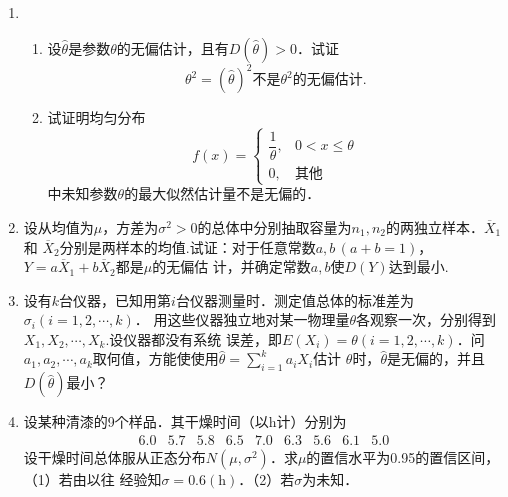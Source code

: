 \documentclass[10pt,a4paper]{article}
\begin{document}
\begin{enumerate}
    \item \begin{enumerate}
        \item 设$\hat{\theta}$是参数$\theta$的无偏估计，且有$D(\hat{\theta})>0$．试证
        $$\hat{\theta^2}=(\hat{\theta})^2\mbox{不是}\theta^2\mbox{的无偏估计.}$$
        \item 试证明均匀分布
        $$f(x)=\left\{\begin{array}{ll}
            \dfrac{1}{\theta}, & 0<x\leq \theta\\
            0, & \mbox{其他}
        \end{array}\right.$$
        中未知参数$\theta$的最大似然估计量不是无偏的．
    \end{enumerate}
    \clearpage



    \item 设从均值为$\mu$，方差为$\sigma^2>0$的总体中分别抽取容量为$n_1,n_2$的两独立样本．$\overline{X}_1$和
    $\overline{X}_2$分别是两样本的均值.试证：对于任意常数$a,b\, (a+b=1)$，$Y=a\overline{X}_1+b\overline{X}_2$都是$\mu$的无偏估
    计，并确定常数$a,b$使$D(Y)$达到最小.
    \clearpage



    \item 设有$k$台仪器，已知用第$i$台仪器测量时．测定值总体的标准差为$\sigma_i(i=1,2,\cdots,k)$．
    用这些仪器独立地对某一物理量$\theta$各观察一次，分别得到$X_1,X_2,\cdots,X_k$.设仪器都没有系统
    误差，即$E(X_i)=\theta(i=1,2,\cdots,k)$．问$a_1,a_2,\cdots,a_k$取何值，方能使使用$\displaystyle{\hat{\theta}=\sum_{i=1}^k a_iX_i}$估计
    $\theta$时，$\hat{\theta}$是无偏的，并且$D(\hat{\theta})$最小？
    \clearpage



    \item 设某种清漆的9个样品．其干燥时间（以h计）分别为
    $$\begin{array}{ccccccccc}
        6.0 & 5.7 & 5.8 & 6.5 & 7.0 & 6.3 & 5.6 & 6.1 & 5.0
    \end{array}$$
    设干燥时间总体服从正态分布$N(\mu,\sigma^2)$．求$\mu$的置信水平为0.95的置信区间，（1）若由以往
    经验知$\sigma=0.6(\mathrm{h})$．（2）若$\sigma$为未知．
    \clearpage




\end{enumerate}
\end{document}
